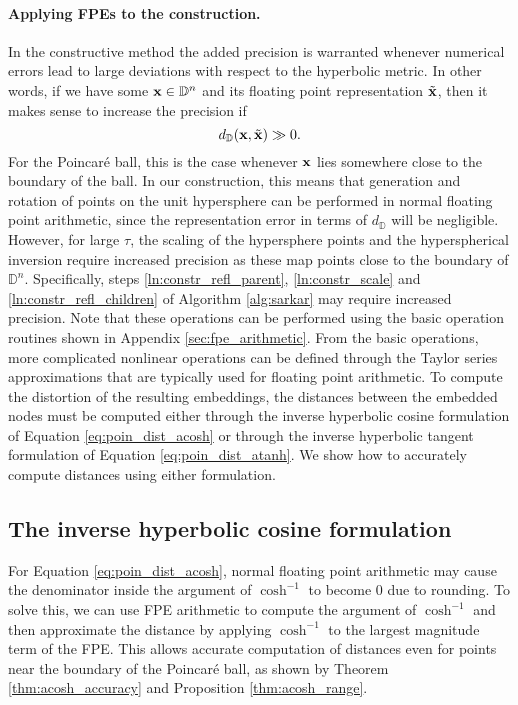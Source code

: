 \vspace{-0.1cm}

\paragraph{Applying FPEs to the construction.}
In the constructive method the added precision is warranted whenever numerical errors lead to large deviations with respect to the hyperbolic metric. In other words, if we have some $\mathbf{x} \in \mathbb{D}^n$ and its floating point representation $\tilde{\mathbf{x}}$, then it makes sense to increase the precision if
\begin{equation}
    d_{\mathbb{D}} (\mathbf{x}, \tilde{\mathbf{x}}) \gg 0.
\end{equation}
For the Poincaré ball, this is the case whenever $\mathbf{x}$ lies somewhere close to the boundary of the ball. In our construction, this means that generation and rotation of points on the unit hypersphere can be performed in normal floating point arithmetic, since the representation error in terms of $d_{\mathbb{D}}$ will be negligible. However, for large $\tau$, the scaling of the hypersphere points and the hyperspherical inversion require increased precision as these map points close to the boundary of $\mathbb{D}^n$. Specifically, steps \ref{ln:constr_refl_parent}, \ref{ln:constr_scale} and \ref{ln:constr_refl_children} of Algorithm \ref{alg:sarkar} may require increased precision. Note that these operations can be performed using the basic operation routines shown in Appendix \ref{sec:fpe_arithmetic}.
From the basic operations, more complicated nonlinear operations can be defined through the Taylor series approximations that are typically used for floating point arithmetic. To compute the distortion of the resulting embeddings, the distances between the embedded nodes must be computed either through the inverse hyperbolic cosine formulation of Equation \ref{eq:poin_dist_acosh} or through the inverse hyperbolic tangent formulation of Equation \ref{eq:poin_dist_atanh}. We show how to accurately compute distances using either formulation.

\subsection{The inverse hyperbolic cosine formulation}
\vspace{-0.1cm}
For Equation \ref{eq:poin_dist_acosh}, normal floating point arithmetic may cause the denominator inside the argument of $\cosh^{-1}$ to become 0 due to rounding. To solve this, we can use FPE arithmetic to compute the argument of $\cosh^{-1}$ and then approximate the distance by applying $\cosh^{-1}$ to the largest magnitude term of the FPE. This allows accurate computation of distances even for points near the boundary of the Poincaré ball, as shown by Theorem \ref{thm:acosh_accuracy} and Proposition \ref{thm:acosh_range}. 

